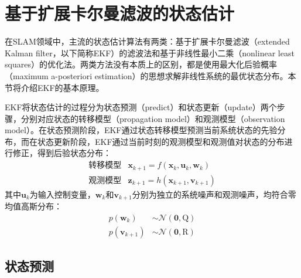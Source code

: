 \section{基于扩展卡尔曼滤波的状态估计}

在SLAM领域中，主流的状态估计算法有两类：基于扩展卡尔曼滤波（extended Kalman filter，以下简称EKF）的滤波法和基于非线性最小二乘（nonlinear least squares）的优化法。两类方法没有本质上的区别，都是使用最大化后验概率（maximum a-posteriori estimation）的思想求解非线性系统的最优状态分布。本节将介绍EKF的基本原理。

EKF将状态估计的过程分为状态预测（predict）和状态更新（update）两个步骤，分别对应状态的转移模型（propagation model）和观测模型（observation model）。在状态预测阶段，EKF通过状态转移模型预测当前系统状态的先验分布，而在状态更新阶段，EKF通过当前时刻的观测模型和观测值对状态的分布进行修正，得到后验状态分布：
\begin{equation}
\begin{array}{rl}
    \text{转移模型} & \bm{x}_{k+1} = f(\bm{x}_k,\bm{u}_k,\bm{w}_k) \\
    \text{观测模型} & \bm{z}_{k+1} = h(\bm{x}_{k+1},\bm{v}_{k+1})
\end{array}
\end{equation}
其中$\bm{u}_k$为输入控制变量，$\bm{w}_k$和$\bm{v}_{k+1}$分别为独立的系统噪声和观测噪声，均符合零均值高斯分布：
\begin{equation}
\begin{aligned}
    p(\bm{w}_k)     &\sim \mathcal{N}(\bm{0},\mathrm{Q}) \\
    p(\bm{v}_{k+1}) &\sim \mathcal{N}(\bm{0},\mathrm{R})
\end{aligned}
\end{equation}

\subsection{状态预测}

